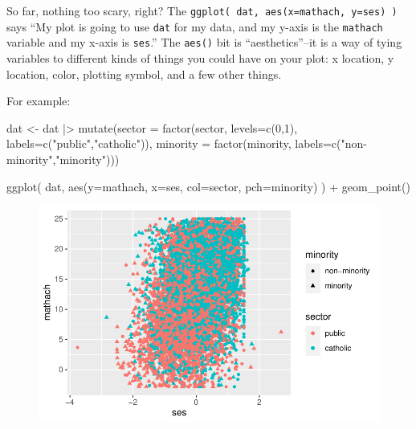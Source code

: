 \documentclass[
  letterpaper,
  DIV=11,
  numbers=noendperiod]{scrreprt}
\newenvironment{Shaded}{\begin{snugshade}}{\end{snugshade}}
\newcommand{\AttributeTok}[1]{\textcolor[rgb]{0.49,0.56,0.16}{#1}}
\newcommand{\DecValTok}[1]{\textcolor[rgb]{0.25,0.63,0.44}{#1}}
\newcommand{\FunctionTok}[1]{\textcolor[rgb]{0.02,0.16,0.49}{#1}}
\newcommand{\NormalTok}[1]{\textcolor[rgb]{0.00,0.44,0.13}{#1}}
\newcommand{\OtherTok}[1]{\textcolor[rgb]{0.00,0.44,0.13}{#1}}
\newcommand{\SpecialCharTok}[1]{\textcolor[rgb]{0.25,0.44,0.63}{#1}}
\newcommand{\StringTok}[1]{\textcolor[rgb]{0.25,0.44,0.63}{#1}}
\begin{document}
So far, nothing too scary, right? The
\texttt{ggplot(\ dat,\ aes(x=mathach,\ y=ses)\ )} says ``My plot is
going to use \texttt{dat} for my data, and my y-axis is the
\texttt{mathach} variable and my x-axis is \texttt{ses}.'' The
\texttt{aes()} bit is ``aesthetics''--it is a way of tying variables to
different kinds of things you could have on your plot: x location, y
location, color, plotting symbol, and a few other things.

For example:

\begin{Shaded}
\begin{Highlighting}[]
\NormalTok{dat }\OtherTok{\textless{}{-}}\NormalTok{ dat }\SpecialCharTok{|\textgreater{}} 
  \FunctionTok{mutate}\NormalTok{(}\AttributeTok{sector =} \FunctionTok{factor}\NormalTok{(sector, }\AttributeTok{levels=}\FunctionTok{c}\NormalTok{(}\DecValTok{0}\NormalTok{,}\DecValTok{1}\NormalTok{), }\AttributeTok{labels=}\FunctionTok{c}\NormalTok{(}\StringTok{"public"}\NormalTok{,}\StringTok{"catholic"}\NormalTok{)),}
         \AttributeTok{minority =} \FunctionTok{factor}\NormalTok{(minority, }\AttributeTok{labels=}\FunctionTok{c}\NormalTok{(}\StringTok{"non{-}minority"}\NormalTok{,}\StringTok{"minority"}\NormalTok{)))}

\FunctionTok{ggplot}\NormalTok{( dat, }\FunctionTok{aes}\NormalTok{(}\AttributeTok{y=}\NormalTok{mathach, }\AttributeTok{x=}\NormalTok{ses, }\AttributeTok{col=}\NormalTok{sector, }\AttributeTok{pch=}\NormalTok{minority) ) }\SpecialCharTok{+} 
  \FunctionTok{geom\_point}\NormalTok{()}
\end{Highlighting}
\end{Shaded}

\begin{figure}[H]

{\centering \includegraphics{intro_ggplot_files/figure-pdf/unnamed-chunk-3-1.pdf}

}

\end{figure}
\end{document}
